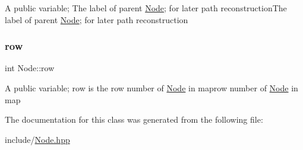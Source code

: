 A public variable; The label of parent \hyperlink{classNode}{Node}; for later path reconstruction\+The label of parent \hyperlink{classNode}{Node}; for later path reconstruction \mbox{\label{classNode_ac13876b3a7e7e1f316bcd922204e5baa}} 
\subsubsection{\texorpdfstring{row}{row}}
{\footnotesize\ttfamily int Node\+::row}

A public variable; row is the row number of \hyperlink{classNode}{Node} in maprow number of \hyperlink{classNode}{Node} in map 

The documentation for this class was generated from the following file\+:\begin{DoxyCompactItemize}
\item 
include/\hyperlink{Node_8hpp}{Node.\+hpp}\end{DoxyCompactItemize}
